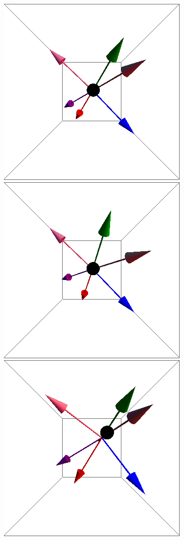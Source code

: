 \documentclass{article}
\begin{document}
\begin{figure}[ht]
\includegraphics[scale=0.22]{100/54S000to005R.png}
\includegraphics[scale=0.22]{100/55S000to005R.png}
\includegraphics[scale=0.22]{100/411S000to005R.png}

\end{figure}
\end{document}
